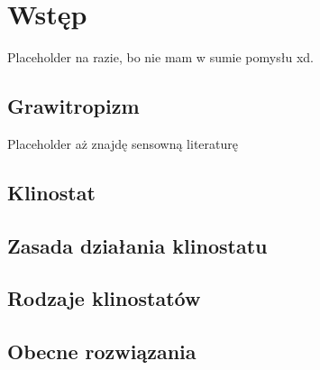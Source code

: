 \chapter{Wstęp}

Placeholder na razie, bo nie mam w sumie pomysłu xd.

\section{Grawitropizm}

Placeholder aż znajdę sensowną literaturę

\section{Klinostat}



\section{Zasada działania klinostatu}

\section{Rodzaje klinostatów}

\section{Obecne rozwiązania}